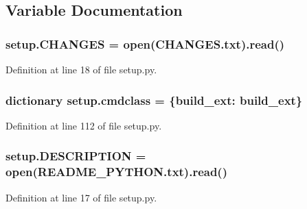 \subsection{Variable Documentation}
\subsubsection[{\texorpdfstring{C\+H\+A\+N\+G\+ES}{CHANGES}}]{\setlength{\rightskip}{0pt plus 5cm}setup.\+C\+H\+A\+N\+G\+ES = open(\textquotesingle{}C\+H\+A\+N\+G\+E\+S.\+txt\textquotesingle{}).read()}\hypertarget{namespacesetup_a0b77f3f30942b5c300c99a938a22f0e4}{}\label{namespacesetup_a0b77f3f30942b5c300c99a938a22f0e4}


Definition at line 18 of file setup.\+py.

\subsubsection[{\texorpdfstring{cmdclass}{cmdclass}}]{\setlength{\rightskip}{0pt plus 5cm}dictionary setup.\+cmdclass = \{\textquotesingle{}build\+\_\+ext\textquotesingle{}\+: build\+\_\+ext\}}\hypertarget{namespacesetup_ad23e0b4fd9e5e6f20f8313d75832d1e2}{}\label{namespacesetup_ad23e0b4fd9e5e6f20f8313d75832d1e2}


Definition at line 112 of file setup.\+py.

\subsubsection[{\texorpdfstring{D\+E\+S\+C\+R\+I\+P\+T\+I\+ON}{DESCRIPTION}}]{\setlength{\rightskip}{0pt plus 5cm}setup.\+D\+E\+S\+C\+R\+I\+P\+T\+I\+ON = open(\textquotesingle{}R\+E\+A\+D\+M\+E\+\_\+\+P\+Y\+T\+H\+O\+N.\+txt\textquotesingle{}).read()}\hypertarget{namespacesetup_aacf82187b02622ad73bf3c715a937aef}{}\label{namespacesetup_aacf82187b02622ad73bf3c715a937aef}


Definition at line 17 of file setup.\+py.

